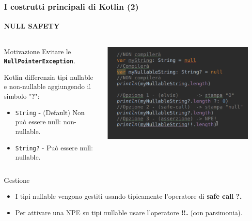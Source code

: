     \begin{frame}
      \frametitle{I costrutti principali di Kotlin (2)}
      \framesubtitle{NULL SAFETY}
      \begin{columns}
        \begin{column}{0.47\textwidth}
          \begin{block}{Motivazione}
             Evitare le \textbf{\texttt{NullPointerException}}.
          \end{block}
          Kotlin differenzia tipi nullable e non-nullable aggiungendo il simbolo "\textbf{?}":
          \begin{itemize}
            \item \texttt{String} - (Default) Non può essere null: \alert{non-nullable}.
            \item \texttt{String?} - Può essere null: \alert{nullable}.
          \end{itemize}
        \end{column}
        \begin{column}{0.5\textwidth}
            \includegraphics[scale=0.33]{NullSafety}
        \end{column}
      \end{columns}
      \begin{block}{Gestione}
      \begin{itemize}
        \item I tipi nullable vengono gestiti usando tipicamente l'operatore di \textbf{safe call} \textbf{\alert{?.}}
        \item Per attivare una NPE su tipi nullable usare l'operatore \textbf{\alert{!!.}} (con parsimonia).
      \end{itemize}
      \end{block}
    \end{frame}

